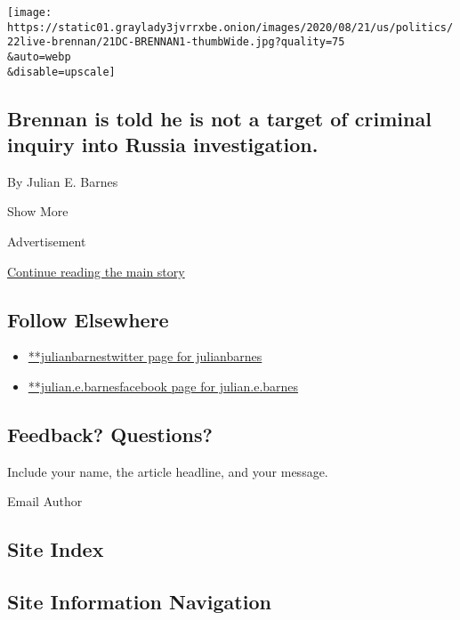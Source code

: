 \begin{enumerate}
  \texttt{[image: https://static01.graylady3jvrrxbe.onion/images/2020/08/21/us/politics/22live-brennan/21DC-BRENNAN1-thumbWide.jpg?quality=75\\\&auto=webp\\\&disable=upscale]}

  \hypertarget{brennan-is-told-he-is-not-a-target-of-criminal-inquiry-into-russia-investigation}{%
  \subsection{Brennan is told he is not a target of criminal inquiry
  into Russia
  investigation.}\label{brennan-is-told-he-is-not-a-target-of-criminal-inquiry-into-russia-investigation}}

  By Julian E. Barnes
\end{enumerate}

Show More

Advertisement

\protect\hyperlink{after-mid2}{Continue reading the main story}

\hypertarget{follow-elsewhere}{%
\subsection{Follow Elsewhere}\label{follow-elsewhere}}

\begin{itemize}
\tightlist
\item
  \href{https://twitter.com/julianbarnes}{**julianbarnestwitter page for
  julianbarnes}
\item
  \href{https://www.facebookcorewwwi.onion/julian.e.barnes}{**julian.e.barnesfacebook
  page for julian.e.barnes}
\end{itemize}

\hypertarget{feedback-questions}{%
\subsection{Feedback? Questions?}\label{feedback-questions}}

Include your name, the article headline, and your message.

Email Author

\hypertarget{site-index}{%
\subsection{Site Index}\label{site-index}}

\hypertarget{site-information-navigation}{%
\subsection{Site Information
Navigation}\label{site-information-navigation}}

